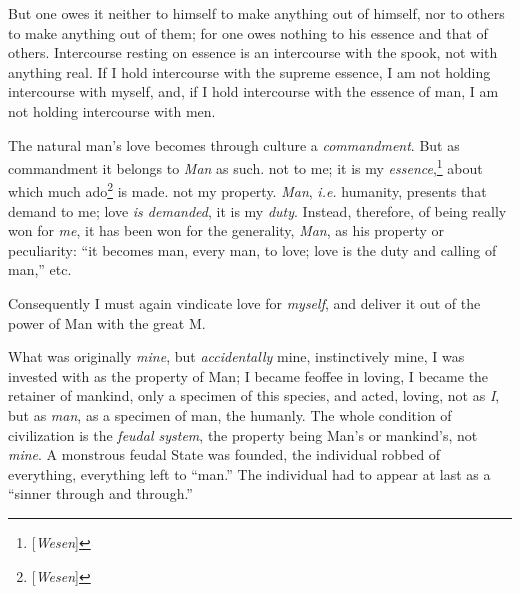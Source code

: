 But one owes it neither to himself to make anything out of himself, nor to 
others to make anything out of them; for one owes nothing to his essence and 
that of others. Intercourse resting on essence is an intercourse with the 
spook, not with anything real. If I hold intercourse with the supreme essence, 
I am not holding intercourse with myself, and, if I hold intercourse with the 
essence of man, I am not holding intercourse with men.

The natural man's love becomes through culture a \textit{commandment}. But as 
commandment it belongs to \textit{Man} as such. not to me; it is my 
\textit{essence},\footnote{[\textit{Wesen}]} about which much 
ado\footnote{[\textit{Wesen}]} is made. not my property. \textit{Man}, 
\textit{i.e.} humanity, presents that demand to me; love \textit{is demanded}, 
it is my \textit{duty}. Instead, therefore, of being really won for 
\textit{me}, it has been won for the generality, \textit{Man}, as his property 
or peculiarity: ``it becomes man, every man, to love; love is the duty and 
calling of man,'' etc.

Consequently I must again vindicate love for \textit{myself}, and deliver it 
out of the power of Man with the great M.

What was originally \textit{mine}, but \textit{accidentally} mine, 
instinctively mine, I was invested with as the property of Man; I became 
feoffee in loving, I became the retainer of mankind, only a specimen of this 
species, and acted, loving, not as \textit{I}, but as \textit{man}, as a 
specimen of man, the humanly. The whole condition of civilization is the 
\textit{feudal system}, the property being Man's or mankind's, not 
\textit{mine}. A monstrous feudal State was founded, the individual robbed of 
everything, everything left to ``man.'' The individual had to appear at last 
as a ``sinner through and through.''

